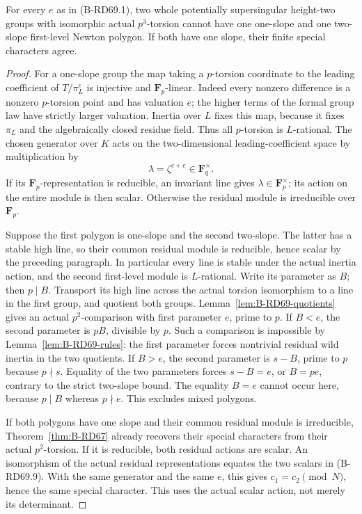 \begin{proposition}
\label{prop:B-RD69-one-slope}
For every \(e\) as in (B-RD69.1), two whole potentially
supersingular height-two groups with isomorphic actual
\(p^3\)-torsion cannot have one one-slope and one two-slope
first-level Newton polygon. If both have one slope, their finite
special characters agree.
\end{proposition}
\begin{proof}
For a one-slope group the map taking a \(p\)-torsion coordinate
to the leading coefficient of \(T/\pi_L^e\) is injective and
\(\mathbf F_p\)-linear. Indeed every nonzero difference is a
nonzero \(p\)-torsion point and has valuation \(e\); the higher
terms of the formal group law have strictly larger valuation.
Inertia over \(L\) fixes this map, because it fixes \(\pi_L\)
and the algebraically closed residue field. Thus all \(p\)-torsion
is \(L\)-rational. The chosen generator over \(K\) acts on the
two-dimensional leading-coefficient space by multiplication by
\[
 \lambda=\zeta^{c+e}\in\mathbf F_q^\times .
 \tag{B-RD69.9}
\]
If its \(\mathbf F_p\)-representation is reducible, an invariant
line gives \(\lambda\in\mathbf F_p^\times\); its action on the
entire module is then scalar. Otherwise the residual module
is irreducible over \(\mathbf F_p\).

Suppose the first polygon is one-slope and the second two-slope.
The latter has a stable high line, so their common residual
module is reducible, hence scalar by the preceding paragraph.
In particular every line is stable under the actual inertia
action, and the second first-level module is \(L\)-rational.
Write its parameter as \(B\); then \(p\mid B\).
Transport its high line across the actual torsion isomorphism
to a line in the first group, and quotient both groups.
Lemma~\ref{lem:B-RD69-quotients} gives an actual \(p^2\)-comparison
with first parameter \(e\), prime to \(p\). If \(B<e\), the
second parameter is \(pB\), divisible by \(p\). Such a comparison
is impossible by Lemma~\ref{lem:B-RD69-rules}: the first parameter
forces nontrivial residual wild inertia in the two quotients.
If \(B>e\), the second parameter is \(s-B\), prime to \(p\)
because \(p\nmid s\). Equality of the two parameters forces
\(s-B=e\), or \(B=pe\), contrary to the strict two-slope bound.
The equality \(B=e\) cannot occur here, because \(p\mid B\)
whereas \(p\nmid e\). This excludes mixed polygons.

If both polygons have one slope and their common residual
module is irreducible, Theorem~\ref{thm:B-RD67} already recovers
their special characters from their actual \(p^2\)-torsion.
If it is reducible, both residual actions are scalar.
An isomorphism of the actual residual representations equates
the two scalars in (B-RD69.9). With the same generator and the
same \(e\), this gives \(c_1=c_2\pmod N\), hence the same
special character. This uses the actual scalar action, not
merely its determinant.
\end{proof}

